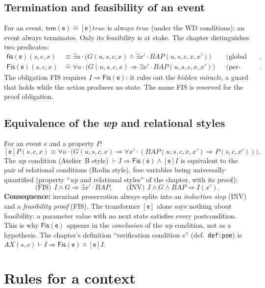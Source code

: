 \documentclass[11pt,a4paper]{article}
\newcommand{\limp}{\Rightarrow}
\newcommand{\AX}{\mathit{AX}(s,c)}
\newcommand{\sff}[1]{\textsf{#1}}
\newcommand{\po}[1]{\textsf{\small #1}}
\newcommand{\trm}{\mathsf{trm}}
\newcommand{\Fis}{\mathsf{Fis}}
\newcommand{\fis}{\mathsf{fis}}
\begin{document}
\subsection{Termination and feasibility of an event}
For an event, $\trm(\sff{e}) \widehat{=} [\sff{e}]\mathit{true}$ is always
$\mathit{true}$ (under the WD conditions): an event always terminates. Only its
feasibility is at stake. The chapter distinguishes two predicates:
\begin{align*}
  \fis(\sff{e})(s,c,x) &\equiv \exists u\cdot\big(G(u,s,c,x)\wedge\exists x'\cdot \mathit{BAP}(u,s,c,x,x')\big)
    && \text{(global feasibility: the actual guard)},\\
  \Fis(\sff{e})(s,c,x) &\widehat{=} \forall u\cdot\big(G(u,s,c,x)\limp \exists x'\cdot \mathit{BAP}(u,s,c,x,x')\big)
    && \text{(per-parameter feasibility)}.
\end{align*}
The obligation \po{FIS} requires $I\limp\Fis(\sff{e})$: it rules out the
\emph{hidden miracle}, a guard that holds while the action produces no state. The
name \po{FIS} is reserved for the proof obligation.

\subsection{Equivalence of the \emph{wp} and relational styles}
For an event \sff{e} and a property $P$:
\[
  [\sff{e}]P(s,c,x) \equiv \forall u\cdot\big(G(u,s,c,x)\limp \forall x'\cdot(\mathit{BAP}(u,s,c,x,x')\limp P(s,c,x'))\big).
\]
The \emph{wp} condition (Atelier~B style)
$\vdash I\limp\Fis(\sff{e})\wedge[\sff{e}]I$ is equivalent to the pair of
relational conditions (Rodin style), free variables being universally quantified
(property ``\emph{wp} and relational styles'' of the chapter, with its proof):
\[
  \text{(FIS)}\ \ I\wedge G \limp \exists x'\cdot \mathit{BAP},
  \qquad
  \text{(INV)}\ \ I\wedge G\wedge \mathit{BAP}\limp I(x').
\]
\textbf{Consequence:} invariant preservation always splits into an \emph{induction
step} (INV) and a \emph{feasibility proof} (FIS). The transformer $[\sff{e}]$ alone
says nothing about feasibility: a parameter value with no next state satisfies
every postcondition. This is why $\Fis(\sff{e})$ appears in the
\emph{conclusion} of the \emph{wp} condition, not as a hypothesis. The chapter's
definition ``verification condition \sff{e}'' (def.~\texttt{def:poe}) is
$\AX\vdash I\limp\Fis(\sff{e})\wedge[\sff{e}]I$.

\section{Rules for a context}
\end{document}
